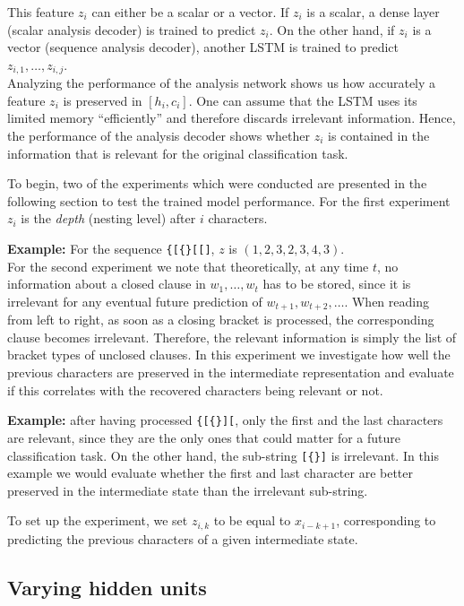 \documentclass[11pt,a4paper]{article}
\begin{document}
This feature $z_i$ can either be a scalar or a vector. If $z_i$ is a scalar, a dense layer (scalar analysis decoder) is trained to predict $z_i$. On the other hand, if $z_i$ is a vector (sequence analysis decoder), another LSTM is trained to predict $z_{i,1},\ldots,z_{i,j}$.\\

Analyzing the performance of the analysis network shows us how accurately a feature $z_i$ is preserved in $[h_i, c_i]$. One can assume that the LSTM uses its limited memory ``efficiently'' and therefore discards irrelevant information. Hence, the performance of the analysis decoder shows whether $z_i$ is contained in the information that is relevant for the original classification task.

To begin, two of the experiments which were conducted are presented in the following section to test the trained model performance. For the first experiment $z_i$ is the \emph{depth} (nesting level) after $i$ characters.

\textbf{Example:} For the sequence \verb|{[{}[[]|, $z$ is $(1,2,3,2,3,4,3)$.\\

For the second experiment we note that theoretically, at any time $t$, no information about a closed clause in $w_1,\ldots, w_t$ has to be stored, since it is irrelevant for any eventual future prediction of $w_{t+1}, w_{t+2},\ldots$. 
When reading from left to right, as soon as a closing bracket is processed, the corresponding clause becomes irrelevant. Therefore, the relevant information is simply the list of bracket types of unclosed clauses. In this experiment we investigate how well the previous characters are preserved in the intermediate representation and evaluate if this correlates with the recovered characters being relevant or not.

\textbf{Example:} after having processed \verb|{[{}][|, only the first and the last characters are relevant, since they are the only ones that could matter for a future classification task. On the other hand, the sub-string \verb|[{}]| is irrelevant. In this example we would evaluate whether the first and last character are better preserved in the intermediate state than the irrelevant sub-string.

To set up the experiment, we set $z_{i,k}$ to be equal to $x_{i-k+1}$, corresponding to predicting the previous characters of a given intermediate state.

\subsection{Varying hidden units}
\label{subsec:varying_hidden_units}
\end{document}
